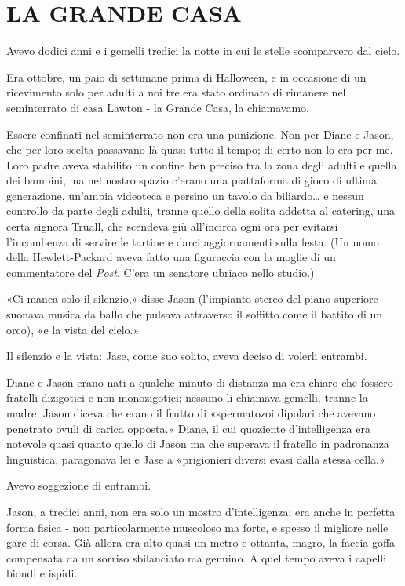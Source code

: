 \chapter{LA GRANDE CASA}\label{la-grande-casa}

\hfill\break

Avevo dodici anni e i gemelli tredici la notte in cui le stelle
scomparvero dal cielo.

Era ottobre, un paio di settimane prima di Halloween, e in occasione di
un ricevimento solo per adulti a noi tre era stato ordinato di rimanere
nel seminterrato di casa Lawton - la Grande Casa, la chiamavamo.

Essere confinati nel seminterrato non era una punizione. Non per Diane e
Jason, che per loro scelta passavano là quasi tutto il tempo; di certo
non lo era per me. Loro padre aveva stabilito un confine ben preciso tra
la zona degli adulti e quella dei bambini, ma nel nostro spazio c'erano
una piattaforma di gioco di ultima generazione, un'ampia videoteca e
persino un tavolo da biliardo\ldots{} e nessun controllo da parte degli
adulti, tranne quello della solita addetta al catering, una certa
signora Truall, che scendeva giù all'incirca ogni ora per evitarsi
l'incombenza di servire le tartine e darci aggiornamenti sulla festa.
(Un uomo della Hewlett-Packard aveva fatto una figuraccia con la moglie
di un commentatore del \emph{Post}. C'era un senatore ubriaco nello
studio.)

«Ci manca solo il silenzio,» disse Jason (l'impianto stereo del piano
superiore suonava musica da ballo che pulsava attraverso il soffitto
come il battito di un orco), «e la vista del cielo.»

Il silenzio e la vista: Jase, come suo solito, aveva deciso di volerli
entrambi.

Diane e Jason erano nati a qualche minuto di distanza ma era chiaro che
fossero fratelli dizigotici e non monozigotici; nessuno li chiamava
gemelli, tranne la madre. Jason diceva che erano il frutto di
«spermatozoi dipolari che avevano penetrato ovuli di carica opposta.»
Diane, il cui quoziente d'intelligenza era notevole quasi quanto quello
di Jason ma che superava il fratello in padronanza linguistica,
paragonava lei e Jase a «prigionieri diversi evasi dalla stessa cella.»

Avevo soggezione di entrambi.

Jason, a tredici anni, non era solo un mostro d'intelligenza; era anche
in perfetta forma fisica - non particolarmente muscoloso ma forte, e
spesso il migliore nelle gare di corsa. Già allora era alto quasi un
metro e ottanta, magro, la faccia goffa compensata da un sorriso
sbilanciato ma genuino. A quel tempo aveva i capelli biondi e ispidi.

